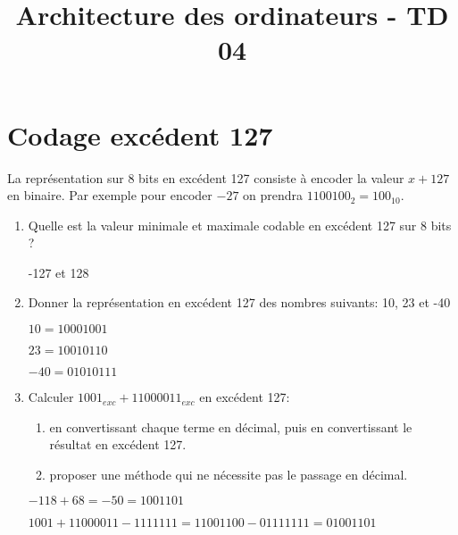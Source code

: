 \documentclass[a4paper,10pt]{exam}
\title{Architecture des ordinateurs - TD 04}
\author{}
\date{}
\begin{document}
\maketitle

\section{Codage excédent 127}

La repr\'esentation sur 8 bits en excédent 127 consiste à
encoder la valeur $x + 127$ en binaire.
Par exemple pour encoder $-27$ on prendra $1100100_2 = 100_{10}$.

\begin{enumerate}
\item Quelle est la valeur minimale et maximale codable en excédent 127
  sur 8 bits ?
  \begin{solution}
    -127 et 128
  \end{solution}
  \item Donner la représentation en excédent 127 des nombres suivants:
    10, 23 et -40
    \begin{solution}
      $10 = 10001001$

      $23 = 10010110$

      $-40 = 01010111$
    \end{solution}
  \item Calculer $1001_{exc} + 11000011_{exc}$ en excédent 127:
    \begin{enumerate}
      \item en convertissant chaque terme en décimal, puis en convertissant
        le résultat en excédent 127.
      \item proposer une méthode qui ne nécessite pas le passage en décimal.
    \end{enumerate}
    \begin{solution}
      $-118 + 68 = -50 = 1001101$

      $1001 + 11000011 - 1111111 = 11001100 - 01111111 = 01001101 $
    \end{solution}
\end{enumerate}
\end{document}
